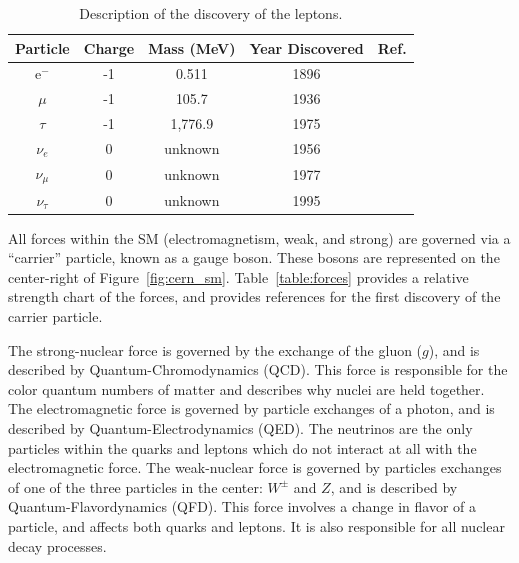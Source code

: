 \begin{table}
\begin{center}
\begin{tabular}{||c c c c c||}
 \hline
 Particle & Charge & Mass (MeV) & Year Discovered & Ref.\\ [0.5ex]
 \hline\hline
 e$^{-}$ & -1 & 0.511 & 1896 & \citep{doi:10.1080/14786449708621070} \\
 \hline
 $\mu$ & -1 & 105.7 & 1936 & \citep{muon_discovery_PhysRev.51.884} \\
 \hline
 $\tau$ & -1 & 1,776.9 & 1975 & \citep{tau_discovery_PhysRevLett.35.1489} \\
 \hline
 $\nu_{e}$ & 0 & unknown & 1956 & \citep{first_neutrino_measurement} \\
 \hline
 $\nu_{\mu}$ & 0 & unknown & 1977 & \citep{PhysRevLett.9.36} \\
 \hline
 $\nu_{\tau}$ & 0 & unknown & 1995 & \citep{tau_neutrino_discovery_KODAMA2001218} \\
 \hline
\end{tabular}
\caption{Description of the discovery of the leptons.
}
\label{table:lepton}
\end{center}
\end{table}

All forces within the SM (electromagnetism, weak, and strong) are governed via a ``carrier'' particle, known as a gauge boson.
These bosons are represented on the center-right of Figure~\ref{fig:cern_sm}.
Table~\ref{table:forces} provides a relative strength chart of the forces, and provides references for the first discovery of the carrier particle.

The strong-nuclear force is governed by the exchange of the gluon ($g$), and is described by Quantum-Chromodynamics (QCD).
This force is responsible for the color quantum numbers of matter and describes why nuclei are held together.
The electromagnetic force is governed by particle exchanges of a photon, and is described by Quantum-Electrodynamics (QED).
The neutrinos are the only particles within the quarks and leptons which do not interact at all with the electromagnetic force.
The weak-nuclear force is governed by particles exchanges of one of the three particles in the center: $W^{\pm}$ and $Z$, and is described by Quantum-Flavordynamics (QFD).
This force involves a change in flavor of a particle, and affects both quarks and leptons.
It is also responsible for all nuclear decay processes.

